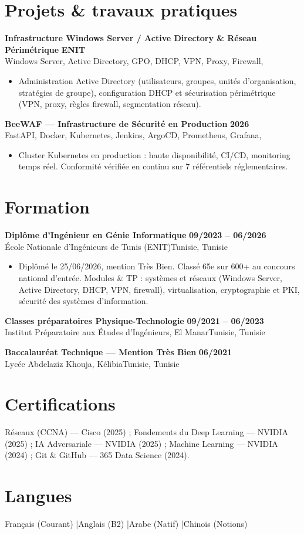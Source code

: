 \documentclass[a4paper,9pt]{article}
\newcommand{\cventry}[4]{\textbf{#1} \hfill \textbf{#4}\\[0.2pt]#2{\ifx\relax#3\relax\else, #3\fi}\par\vspace{0.3pt}}
\begin{document}
\section{Projets \& travaux pratiques}
\cventry{Infrastructure Windows Server / Active Directory \& Réseau Périmétrique}{Windows Server, Active Directory, GPO, DHCP, VPN, Proxy, Firewall}{}{ENIT}
\begin{itemize}
  \item Administration Active Directory (utilisateurs, groupes, unités d'organisation, stratégies de groupe), configuration DHCP et sécurisation périmétrique (VPN, proxy, règles firewall, segmentation réseau).
\end{itemize}
\cventry{BeeWAF --- Infrastructure de Sécurité en Production}{FastAPI, Docker, Kubernetes, Jenkins, ArgoCD, Prometheus, Grafana}{}{2026}
\begin{itemize}
  \item Cluster Kubernetes en production : haute disponibilité, CI/CD, monitoring temps réel. Conformité vérifiée en continu sur 7 référentiels réglementaires.
\end{itemize}
\section{Formation}
\cventry{Diplôme d'Ingénieur en Génie Informatique}{École Nationale d'Ingénieurs de Tunis (ENIT)}{Tunisie}{09/2023 -- 06/2026}
\begin{itemize}
  \item Diplômé le 25/06/2026, mention Très Bien. Classé 65e sur 600+ au concours national d'entrée. Modules \& TP : systèmes et réseaux (Windows Server, Active Directory, DHCP, VPN, firewall), virtualisation, cryptographie et PKI, sécurité des systèmes d'information.
\end{itemize}
\cventry{Classes préparatoires Physique-Technologie}{Institut Préparatoire aux Études d'Ingénieurs, El Manar}{Tunisie}{09/2021 -- 06/2023}
\cventry{Baccalauréat Technique --- Mention Très Bien}{Lycée Abdelaziz Khouja, Kélibia}{Tunisie}{06/2021}
\section{Certifications}
Réseaux (CCNA) --- Cisco (2025) ; Fondements du Deep Learning --- NVIDIA (2025) ; IA Adversariale --- NVIDIA (2025) ; Machine Learning --- NVIDIA (2024) ; Git \& GitHub --- 365 Data Science (2024).
\section{Langues}
Français (Courant) \quad|\quad Anglais (B2) \quad|\quad Arabe (Natif) \quad|\quad Chinois (Notions)
\end{document}
